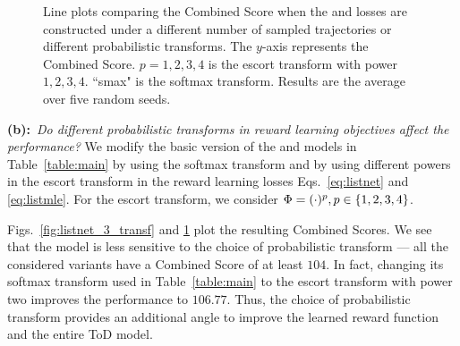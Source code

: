 \begin{figure}[tb]
\begin{subfigure}[b]{0.24\textwidth}
         \captionsetup{font=small}
         \vspace{-6mm}
         \caption{\rewardmle}
         \label{fig:listmle_5_transf}
     \end{subfigure}
     \vspace{-2mm}
     \captionsetup{font=small}
        \caption{ 
        \footnotesize{Line plots comparing the Combined Score when the \rewardnet and \rewardmle losses are constructed under a different number of sampled trajectories or different probabilistic transforms.
        The $y$-axis represents the Combined Score.
        $p=1,2,3,4$ is the escort transform with power $1,2,3,4$.
        ``smax" is the softmax transform.
        Results are the average over five random seeds.}
        }
        \label{fig:abla_sweep}
        \vspace{-1.5em}
\end{figure}

\textbf{(b):}~\textit{Do different probabilistic transforms in reward learning objectives affect the performance?}
We modify the basic version of the \rewardnet and \rewardmle models in Table~\ref{table:main} by using the softmax transform and by using different powers in the escort transform in the reward learning losses Eqs.~\eqref{eq:listnet} and \eqref{eq:listmle}.
For the escort transform, we consider $\Phi=(\cdot)^p, p\in \left\{1,2,3,4\right\}$.

Figs.~\ref{fig:listnet_3_transf} and \ref{fig:listmle_5_transf} plot the resulting Combined Scores.
We see that the \rewardmle model is less sensitive to the choice of probabilistic transform --- all the considered variants have a Combined Score of at least $104$.
In fact, changing its softmax transform used in Table~\ref{table:main} to the escort transform with power two improves the performance to $106.77$.
Thus, the choice of probabilistic transform provides an additional angle to improve the learned reward function and the entire ToD model.

